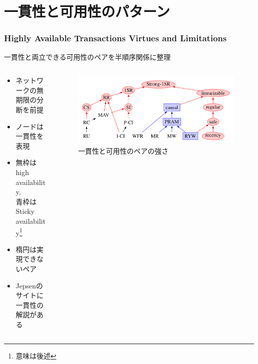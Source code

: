 \documentclass[unicode, 14pt, aspectratio=169]{beamer}
\begin{document}
\section{一貫性と可用性のパターン}
\begin{frame}
  \frametitle{\normalsize{Highly Available Transactions Virtues and Limitations\supercite{high}}}
  {\large 一貫性と両立できる可用性のペアを半順序関係に整理}
  \begin{columns}
    \begin{column}{0.5\textwidth}
      \begin{itemize}
      \item {\small ネットワークの無期限の分断を前提}
      \item {\small ノードは一貫性を表現}
      \item {\small 無枠はhigh availability,\\青枠はSticky availability\footnote{意味は後述}}
      \item {\small 楕円は実現できないペア}        
      \item {\small Jepsenのサイトに一貫性の\\解説がある\supercite{jepsen-models}}
      \end{itemize}
    \end{column}    
    \begin{column}{0.5\textwidth}
      \begin{figure}
        \includegraphics[width=1\textwidth]{images/hat.png}
        \caption{一貫性と可用性のペアの強さ\supercite{high}}
      \end{figure}
    \end{column} 
  \end{columns}
\end{frame}
\end{document}
